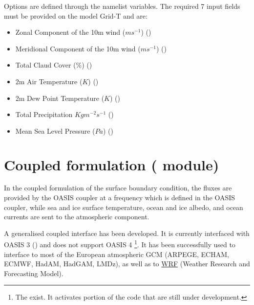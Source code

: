 Options are defined through the   namelist variables.
The required 7 input fields must be provided on the model Grid-T and  are:
\begin{itemize}
\item          Zonal Component of the 10m wind ($ms^{-1}$)  ()
\item          Meridional Component of the 10m wind ($ms^{-1}$)  ()
\item          Total Claud Cover (\%)  ()
\item          2m Air Temperature ($K$) ()
\item          2m Dew Point Temperature ($K$)  ()
\item          Total Precipitation ${Kg} m^{-2} s^{-1}$ ()
\item          Mean Sea Level Pressure (${Pa}$) ()
\end{itemize}
\section  [Coupled formulation (\textit{sbccpl}) ]
		{Coupled formulation ( module)}
\label{SBC_cpl}

In the coupled formulation of the surface boundary condition, the fluxes are 
provided by the OASIS coupler at a frequency which is defined in the OASIS coupler, 
while sea and ice surface temperature, ocean and ice albedo, and ocean currents 
are sent to the atmospheric component.

A generalised coupled interface has been developed. It is currently interfaced with OASIS 3
() and does not support OASIS 4
\footnote{The  exist. It activates portion of the code that are still under development.}. 
It has been successfully used to interface \NEMO to most of the European atmospheric 
GCM (ARPEGE, ECHAM, ECMWF, HadAM, HadGAM, LMDz), 
as well as to \href{http://wrf-model.org/}{WRF} (Weather Research and Forecasting Model).

